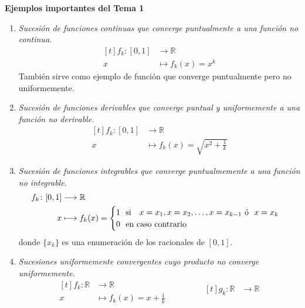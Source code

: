 \documentclass[12pt]{report}
\theoremstyle{definition}
\theoremstyle{definition}
\theoremstyle{remark}
\newcommand{\R}{\mathbb R}
\begin{document}
\small

\setlength{\abovedisplayskip}{10pt}
\setlength{\belowdisplayskip}{10pt}

\begin{center}
    \textbf{Ejemplos importantes del Tema 1}
\end{center}

\begin{enumerate}[leftmargin=*]
    \item \textit{Sucesión de funciones continuas que converge puntualmente a una función no continua.}
    \[
    \begin{aligned}[t]
    f_k \colon [0,1] &\longrightarrow \R \\
    x &\longmapsto f_k(x)=x^k
    \end{aligned}
    \]
    También sirve como ejemplo de función que converge puntualmente pero no uniformemente.
    \item \textit{Sucesión de funciones derivables que converge puntual y uniformemente a una función no derivable.}
    \[
    \begin{aligned}[t]
    f_k \colon [0,1] &\longrightarrow \R \\
    x &\longmapsto f_k(x)=\sqrt{x^2+\frac{1}{k}}
    \end{aligned}
    \]
    \item \textit{Sucesión de funciones integrables que converge puntualmemente a una función no integrable.}
    \[
    \begin{aligned}[t]
    f_k \colon [0,1] &\longrightarrow \R \\
    x &\longmapsto f_k(x)=\begin{cases}
        1 $\ \ si \ \ $ x=x_1, x=x_2,\mathellipsis, x=x_{k-1} $\ ó \ $ x = x_k \\
        0 $\ \ en caso contrario$
    \end{cases}
    \end{aligned}
    \]
    donde $\{x_k\}$ es una enumeración de los racionales de $[0,1]$.
    \item \textit{Sucesiones uniformemente convergentes cuyo producto no converge uniformemente.}
    \[
    \begin{aligned}[t]
    f_k \colon \R &\longrightarrow \R \\
    x &\longmapsto f_k(x)=x+\frac{1}{k}
    \end{aligned} \qquad \qquad    \begin{aligned}[t]
    g_k \colon \R &\longrightarrow \R \\

\end{aligned}\]
\end{enumerate}
\end{document}
